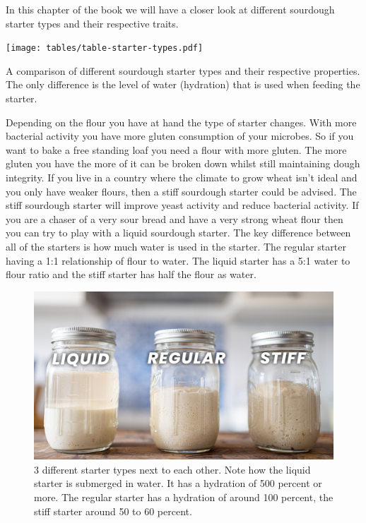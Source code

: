 In this chapter of the book we will have a closer look
at different sourdough starter types and their respective
traits.

\begin{table}[htp!]
  \texttt{[image: tables/table-starter-types.pdf]}
  \caption{A comparison of different sourdough starter types and their
  respective properties. The only difference is the level of water (hydration)
  that is used when feeding the starter.}
  \label{tab:starter-types-comparison}
\end{table}

Depending on the flour you have at hand the type of starter changes. With more
bacterial activity you have more gluten consumption of your microbes. So if
you want to bake a free standing loaf you need a flour with more gluten. The
more gluten you have the more of it can be broken down whilst still maintaining
dough integrity. If you live in a country where the climate to grow wheat
isn't ideal and you only have weaker flours, then a stiff sourdough starter
could be advised. The stiff sourdough starter will improve yeast activity and
reduce bacterial activity. If you are a chaser of a very sour bread and have a
very strong wheat flour then you can try to play with a liquid sourdough
starter. The key difference between all of the starters is how much water
is used in the starter. The regular starter having a 1:1 relationship of flour
to water. The liquid starter has a 5:1 water to flour ratio and the stiff
starter has half the flour as water.

\begin{figure}[!htb]
  \includegraphics[width=\textwidth]{sourdough-starter-types}
  \caption{3 different starter types next to each other. Note how the liquid starter is submerged
  in water. It has a hydration of 500 percent or more.
  The regular starter has a hydration of around 100 percent, the stiff starter around 50 to 60 percent.}
  \label{fig:starter-types}
\end{figure}


